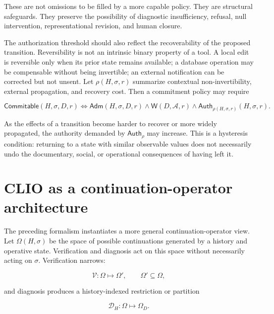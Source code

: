 \documentclass[11pt]{article}
\begin{document}
These are not omissions to be filled by a more capable policy. They are structural safeguards. They preserve the possibility of diagnostic insufficiency, refusal, null intervention, representational revision, and human closure.

The authorization threshold should also reflect the recoverability of the proposed transition. Reversibility is not an intrinsic binary property of a tool. A local edit is reversible only when its prior state remains available; a database operation may be compensable without being invertible; an external notification can be corrected but not unsent. Let $\rho(H,\sigma,r)$ summarize contextual non-invertibility, external propagation, and recovery cost. Then a commitment policy may require

\begin{equation}
\mathsf{Commitable}(H,\sigma,D,r)
\Longleftrightarrow
\mathsf{Adm}(H,\sigma,D,r)
\land \mathsf W(D,\mathcal A,r)
\land \mathsf{Auth}_{\rho(H,\sigma,r)}(H,\sigma,r).
\label{eq:commitability}
\end{equation}

As the effects of a transition become harder to recover or more widely propagated, the authority demanded by $\mathsf{Auth}_{\rho}$ may increase. This is a hysteresis condition: returning to a state with similar observable values does not necessarily undo the documentary, social, or operational consequences of having left it.

\section{CLIO as a continuation-operator architecture}

The preceding formalism instantiates a more general continuation-operator view. Let $\Omega(H,\sigma)$ be the space of possible continuations generated by a history and operative state. Verification and diagnosis act on this space without necessarily acting on $\sigma$. Verification narrows:

\begin{equation}
\mathcal V:\Omega\longmapsto\Omega',
\qquad \Omega'\subseteq\Omega,
\end{equation}

and diagnosis produces a history-indexed restriction or partition

\begin{equation}
\mathcal D_H:\Omega\longmapsto\Omega_D.
\end{equation}
\end{document}
